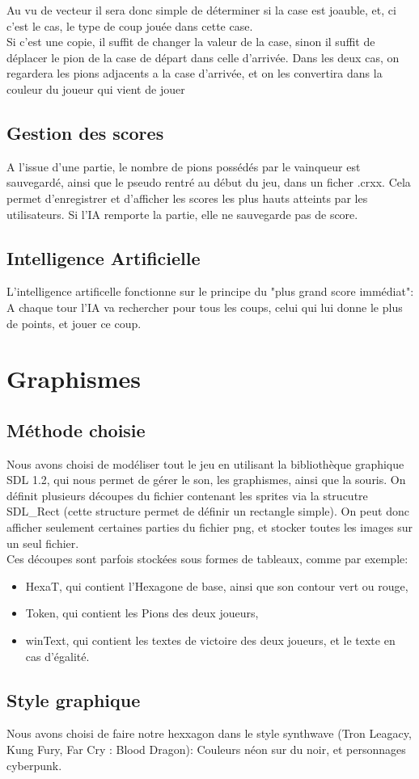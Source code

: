 \documentclass{report}
\begin{document}
	Au vu de vecteur il sera donc simple de déterminer si la case est joauble, et, ci c'est le cas, le type de coup jouée dans cette case.\\
	Si c'est une copie, il suffit de changer la valeur de la case, sinon il suffit de déplacer le pion de la case de départ dans celle d'arrivée. Dans les deux cas, on regardera les pions adjacents a la case d'arrivée, et on les convertira dans la couleur du joueur qui vient de jouer
	\subsection{Gestion des scores}
	
	A l'issue d'une partie, le nombre de pions possédés par le vainqueur est sauvegardé, ainsi que le pseudo rentré au début du jeu, dans un ficher .crxx.
	Cela permet d'enregistrer et d'afficher les scores les plus hauts atteints par les utilisateurs. Si l'IA remporte la partie, elle ne sauvegarde pas de score. 

	\subsection{Intelligence Artificielle}
	
	L'intelligence artificelle fonctionne sur le principe du "plus grand score immédiat": A chaque tour l'IA va rechercher pour tous les coups, celui qui lui donne le plus de points, et jouer ce coup.
	
\newpage
\section{Graphismes}
	\subsection{Méthode choisie}
	
		Nous avons choisi de modéliser tout le jeu en utilisant la bibliothèque graphique SDL 1.2, qui nous permet de gérer le son, les graphismes, ainsi que la souris. On définit plusieurs découpes du fichier contenant les sprites via la strucutre SDL\_Rect (cette structure permet de définir un rectangle simple). On peut donc afficher seulement certaines parties du fichier png, et stocker toutes les images sur un seul fichier.\\
		
		Ces découpes sont parfois stockées sous formes de tableaux, comme par exemple:\begin{itemize}
		\item HexaT, qui contient l'Hexagone de base, ainsi que son contour vert ou rouge,
		\item Token, qui contient les Pions des deux joueurs,
		\item winText, qui contient les textes de victoire des deux joueurs, et le texte en cas d'égalité.
		\end {itemize}
		
	\subsection{Style graphique}
	
		Nous avons choisi de faire notre hexxagon dans le style synthwave (Tron Leagacy, Kung Fury, Far Cry : Blood Dragon): Couleurs néon sur du noir, et personnages cyberpunk.
\end{document}
